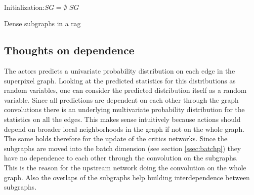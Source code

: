 \vspace{8mm}\\
\begin{algorithm}[H]
	Initialization:$SG = \emptyset$\;
	\Return $SG$
	\caption{Dense subgraphs in a rag}
	\label{algo:sgs}
\end{algorithm}
\vspace{8mm}

\subsection{Thoughts on dependence}

The actors predicts a univariate probability distribution on each edge in the superpixel graph. Looking at the predicted statistics for this distributions as random variables, one can consider the predicted distribution itself as a random variable. Since all predictions are dependent on each other through the graph convolutions there is an underlying multivariate probability distribution for the statistics on all the edges. This makes sense intuitively because actions should depend on broader local neighborhoods in the graph if not on the whole graph.\\
The same holds therefore for the update of the critics networks. Since the subgraphs are moved into the batch dimension (see section \ref{ssec:batchp}) they have no dependence to each other through the convolution on the subgraphs. This is the reason for the upstream network doing the convolution on the whole graph. Also
the overlaps of the subgraphs help building interdependence between subgraphs.
